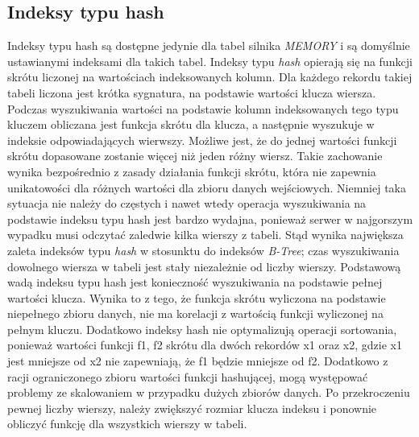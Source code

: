 
\subsection{Indeksy typu hash}
Indeksy typu hash są dostępne jedynie dla tabel silnika \textit{MEMORY} i są domyślnie ustawianymi indeksami dla takich tabel. Indeksy typu \textit{hash} opierają się na funkcji skrótu liczonej na wartościach indeksowanych kolumn. Dla każdego rekordu takiej tabeli liczona jest krótka sygnatura, na podstawie wartości klucza wiersza. Podczas wyszukiwania wartości na podstawie kolumn indeksowanych tego typu kluczem obliczana jest funkcja skrótu dla klucza, a następnie wyszukuje w indeksie odpowiadających wierwszy. Możliwe jest, że do jednej wartości funkcji skrótu dopasowane zostanie więcej niż jeden różny wiersz. Takie zachowanie wynika bezpośrednio z zasady działania funkcji skrótu, która nie zapewnia unikatowości dla różnych wartości dla zbioru danych wejściowych. Niemniej taka sytuacja nie należy do częstych i nawet wtedy operacja wyszukiwania na podstawie indeksu typu hash jest bardzo wydajna, ponieważ serwer w najgorszym wypadku musi odczytać zaledwie kilka wierszy z tabeli. Stąd wynika największa zaleta indeksów typu \textit{hash} w stosunktu do indeksów \textit{B-Tree}; czas wyszukiwania dowolnego wiersza w tabeli jest stały niezależnie od liczby wierszy. Podstawową wadą indeksu typu hash jest konieczność wyszukiwania na podstawie pełnej wartości klucza. Wynika to z tego, że funkcja skrótu wyliczona na podstawie niepełnego zbioru danych, nie ma korelacji z wartością funkcji wyliczonej na pełnym kluczu. Dodatkowo indeksy hash nie optymalizują operacji sortowania, ponieważ wartości funkcji f1, f2 skrótu dla dwóch rekordów x1 oraz x2, gdzie x1 jest mniejsze od x2 nie zapewniają, że f1 będzie mniejsze od f2. Dodatkowo z racji ograniczonego zbioru wartości funkcji hashującej, mogą występować problemy ze skalowaniem w przypadku dużych zbiorów danych. Po przekroczeniu pewnej liczby wierszy, należy zwiększyć rozmiar klucza indeksu i ponownie obliczyć funkcję dla wszystkich wierszy w tabeli.
